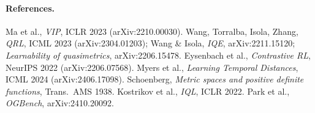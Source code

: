 \documentclass[10pt]{article}
\begin{document}
\paragraph{References.} Ma et al., \emph{VIP}, ICLR 2023 (arXiv:2210.00030). Wang, Torralba, Isola, Zhang, \emph{QRL}, ICML 2023 (arXiv:2304.01203); Wang \& Isola, \emph{IQE}, arXiv:2211.15120; \emph{Learnability of quasimetrics}, arXiv:2206.15478. Eysenbach et al., \emph{Contrastive RL}, NeurIPS 2022 (arXiv:2206.07568). Myers et al., \emph{Learning Temporal Distances}, ICML 2024 (arXiv:2406.17098). Schoenberg, \emph{Metric spaces and positive definite functions}, Trans.\ AMS 1938. Kostrikov et al., \emph{IQL}, ICLR 2022. Park et al., \emph{OGBench}, arXiv:2410.20092.
\end{document}

